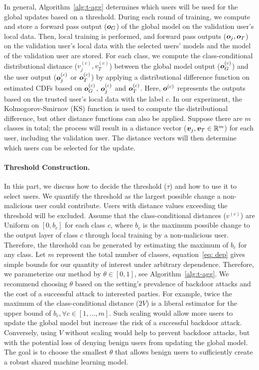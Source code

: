 \documentclass{article} %
\begin{document}
In general, Algorithm~\ref{alg:t-agg} determines which users will be used for the global updates based on a threshold. During each round of training, we compute and store a forward pass output (${\bm{o}}_G$) of the global model on the validation user's local data. Then, local training is performed, and forward pass outputs (${\bm{o}}_j, {\bm{o}}_T$) on the validation user's local data with the selected users' models and the model of the validation user are stored. For each class, we compute the class-conditional distributional distance ($v^{(c)}_j, v^{(c)}_T$) between the global model output (${\bm{o}}^{(c)}_G$) and the user output (${\bm{o}}^{(c)}_j$ or ${\bm{o}}^{(c)}_T$) by applying a distributional difference function on estimated CDFs based on ${\bm{o}}^{(c)}_G$, ${\bm{o}}^{(c)}_j$ and ${\bm{o}}^{(c)}_T$. Here, ${\bm{o}}^{(c)}$ represents the outputs based on the trusted user's local data with the label $c$. In our experiment, the Kolmogorov-Smirnov (KS) function is used to compute the distributional difference, but other distance functions can also be applied. Suppose there are $m$ classes in total; the process will result in a distance vector (${\bm{v}}_j, {\bm{v}}_T\in{\mathbb{R}}^m$) for each user, including the validation user. The distance vectors will then determine which users can be selected for the update.

\paragraph{Threshold Construction.} In this part, we discuss how to decide the threshold ($\tau$) and how to use it to select users.  We quantify the threshold as the largest possible change a non-malicious user could contribute. Users with distance values exceeding the threshold will be excluded. Assume that the class-conditional distances ($v^{(c)}$) are Uniform on $[0, b_c]$ for each class $c$, where $b_c$ is the maximum possible change to the output layer of class $c$ through local training by a non-malicious user.  Therefore, the threshold can be generated by estimating the maximum of $b_c$ for any class.  Let $m$ represent the total number of classes, equation~\ref{eq: dep} gives simple bounds for our quantity of interest under arbitrary dependence. Therefore, we parameterize our method by $\theta \in [0, 1]$, see Algorithm~\ref{alg:t-agg}. We recommend choosing $\theta$ based on the setting's prevalence of backdoor attacks and the cost of a successful attack to interested parties. For example, twice the maximum of the class-conditional distance ($2V$) is a liberal estimator for the upper bound of $b_c, \forall c\in [1,...,m]$. Such scaling would allow more users to update the global model but increase the risk of a successful backdoor attack. Conversely, using $V$ without scaling would help to prevent backdoor attacks, but with the potential loss of denying benign users from updating the global model. The goal is to choose the smallest $\theta$ that allows benign users to sufficiently create a robust shared machine learning model.
\end{document}
